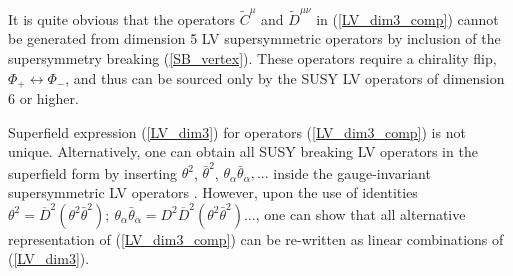 \documentclass[12pt]{revtex4}
\begin{document}
It is quite obvious that the operators $ \widetilde{C}^\mu $
and $ \widetilde{D}^{\mu\nu} $ in (\ref{LV_dim3_comp}) cannot
be generated from dimension 5 LV supersymmetric operators 
by inclusion of the supersymmetry breaking (\ref{SB_vertex}). 
These operators require a chirality flip, $\Phi_+\leftrightarrow \Phi_-$, 
and thus can be sourced  only by the SUSY LV operators of dimension 6 or higher.

Superfield expression (\ref{LV_dim3}) for operators (\ref{LV_dim3_comp}) is not unique.
Alternatively, one can obtain 
all SUSY breaking LV operators in the superfield form by
inserting  $ \theta^2 $, 
$ \bar{\theta}^2 $, 
$ \theta_\alpha \bar{\theta}_{\dot\alpha},... $ inside the 
gauge-invariant supersymmetric LV operators \cite{GrootNibbelink:2004za}.
However, upon the use of identities $\theta^2 =  \overline{D}^2 ( \theta^2 \bar{\theta}^2 );~
\theta_\alpha \bar{\theta}_{\dot\alpha}  = 
D^2 \overline{D}^2 ( \theta^2 \bar{\theta}^2 ) 
          \ldots $,  
one can show that all alternative representation of (\ref{LV_dim3_comp})
can be re-written as linear combinations of (\ref{LV_dim3}).
\end{document}
